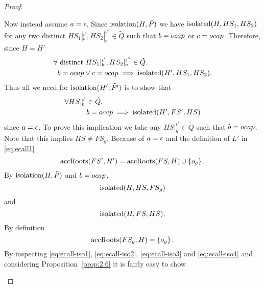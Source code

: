 \begin{proof}
\begin{description}
\begin{description}
          Now instead assume $a = \mbox{$\epsilon$}$. Since $\mbox{$\mathrm{isolation}$}(H, \tilde{P})$ we have
          $\mbox{$\mathrm{isolated}$}(H, HS_1, HS_2)$ for any two distinct $HS_1|_b^{\iota'},
          HS_2|_c^{\iota''}
          \in \tilde{Q}$ such that $b = \mbox{$ocap$}$ or $c = \mbox{$ocap$}$. Therefore, since $H = H'$
          \begin{equation}
            \begin{aligned}
              \forall &\text{ distinct } HS_1|_b^{\iota'}, HS_2|_c^{\iota''} \in \tilde{Q}. \\ 
              & b = \mbox{$ocap$} \lor c = \mbox{$ocap$} \implies \mbox{$\mathrm{isolated}$}(H', HS_1, HS_2).
            \end{aligned}
          \end{equation}
          Thus all we need for $\mbox{$\mathrm{isolation}$}(H', \tilde{P'})$ is to show that
          \begin{equation}
            \begin{aligned}
              \forall HS|_b^{\iota'} &\in \tilde{Q} . \\
              &b = \mbox{$ocap$} \implies \mbox{$\mathrm{isolated}$}(H', FS', HS)
            \end{aligned}
          \end{equation}
          since $a = \mbox{$\epsilon$}$. To prove this implication we take any
          $HS|_b^{\iota'} \in
          \tilde{Q}$ such that $b = \mbox{$ocap$}$. Note that this implies $HS \neq
          FS_g$. Because of $a = \mbox{$\epsilon$}$ and the definition of $L'$ in
          \eqref{eq:ecall1}
          \begin{equation} \label{eq:ecall-iso1}
            \mbox{$\mathrm{accRoots}$}(FS', H') = \mbox{$\mathrm{accRoots}$}(FS, H) \cup \left\{ o_g \right\}.
          \end{equation}
          By $\mbox{$\mathrm{isolation}$}(H, \tilde{P})$  and $b = \mbox{$ocap$}$,
          \begin{equation} \label{eq:ecall-iso2}
            \mbox{$\mathrm{isolated}$}(H, HS, FS_g)
          \end{equation}
          and
          \begin{equation} \label{eq:ecall-iso4}
            \mbox{$\mathrm{isolated}$}(H, FS, HS).
          \end{equation}
          By definition
          \begin{equation} \label{eq:ecall-iso3}
            \mbox{$\mathrm{accRoots}$}(FS_g, H) = \left\{o_g \right\}.
          \end{equation}
          By inspecting \eqref{eq:ecall-iso1}, \eqref{eq:ecall-iso2},
          \eqref{eq:ecall-iso3} and \eqref{eq:ecall-iso4} and considering
          Proposition~\ref{prop:2.6} it is fairly easy to show

\end{description}
\end{description}
\end{proof}
